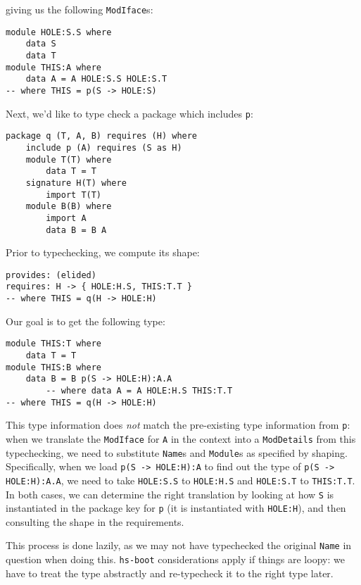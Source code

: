 \documentclass{article}
\begin{document}
giving us the following \verb|ModIface|s:

\begin{verbatim}
module HOLE:S.S where
    data S
    data T
module THIS:A where
    data A = A HOLE:S.S HOLE:S.T
-- where THIS = p(S -> HOLE:S)
\end{verbatim}

Next, we'd like to type check a package which includes \verb|p|:

\begin{verbatim}
package q (T, A, B) requires (H) where
    include p (A) requires (S as H)
    module T(T) where
        data T = T
    signature H(T) where
        import T(T)
    module B(B) where
        import A
        data B = B A
\end{verbatim}


Prior to typechecking, we compute its shape:

\begin{verbatim}
provides: (elided)
requires: H -> { HOLE:H.S, THIS:T.T }
-- where THIS = q(H -> HOLE:H)
\end{verbatim}

Our goal is to get the following type:

\begin{verbatim}
module THIS:T where
    data T = T
module THIS:B where
    data B = B p(S -> HOLE:H):A.A
        -- where data A = A HOLE:H.S THIS:T.T
-- where THIS = q(H -> HOLE:H)
\end{verbatim}

This type information does \emph{not} match the pre-existing
type information from \verb|p|: when we translate the \verb|ModIface| for
\verb|A| in the context into a \verb|ModDetails| from this typechecking,
we need to substitute \verb|Name|s and \verb|Module|s
as specified by shaping.  Specifically, when we load \verb|p(S -> HOLE:H):A|
to find out the type of \verb|p(S -> HOLE:H):A.A|,
we need to take \verb|HOLE:S.S| to \verb|HOLE:H.S| and \verb|HOLE:S.T| to \verb|THIS:T.T|.
In both cases, we can determine the right translation by looking at how \verb|S| is
instantiated in the package key for \verb|p| (it is instantiated with \verb|HOLE:H|),
and then consulting the shape in the requirements.

This process is done lazily, as we may not have typechecked the original
\verb|Name| in question when doing this.  \verb|hs-boot| considerations apply
if things are loopy: we have to treat the type abstractly and re-typecheck it
to the right type later.
\end{document}
